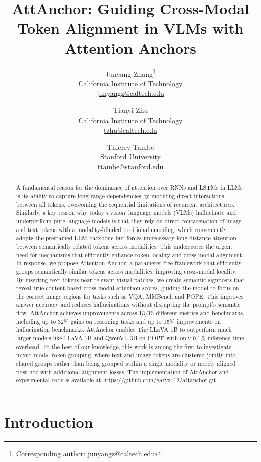 \documentclass[11pt]{article}
\title{AttAnchor: Guiding Cross-Modal Token Alignment in VLMs with Attention Anchors}
\author{Junyang Zhang\footnote{Corresponding author: \href{mailto:junyangz@caltech.edu}{junyangz@caltech.edu}}\\
California Institute of Technology\\
\href{mailto:junyangz@caltech.edu}{junyangz@caltech.edu}
\and
Tianyi Zhu\\
California Institute of Technology\\
\href{mailto:tzhu@caltech.edu}{tzhu@caltech.edu}
\and
Thierry Tambe\\
Stanford University\\
\href{mailto:ttambe@stanford.edu}{ttambe@stanford.edu}
}
\begin{document}
\captionsetup{position=bottom}
\captionsetup[figure]{position=bottom}
\captionsetup[table]{position=bottom}

\maketitle

\begin{abstract}
A fundamental reason for the dominance of attention over RNNs and LSTMs in LLMs is its ability to capture long-range dependencies by modeling direct interactions between all tokens, overcoming the sequential limitations of recurrent architectures. Similarly, a key reason why today's vision–language models (VLMs) hallucinate and underperform pure language models is that they rely on direct concatenation of image and text tokens with a modality-blinded positional encoding, which conveniently adopts the pretrained LLM backbone but forces unnecessary long-distance attention between semantically related tokens across modalities. This underscores the urgent need for mechanisms that efficiently enhance token locality and cross-modal alignment. In response, we propose Attention Anchor, a parameter-free framework that efficiently groups semantically similar tokens across modalities, improving cross-modal locality. By inserting text tokens near relevant visual patches, we create semantic signposts that reveal true content-based cross-modal attention scores, guiding the model to focus on the correct image regions for tasks such as VQA, MMBench and POPE. This improves answer accuracy and reduces hallucinations without disrupting the prompt's semantic flow. AttAnchor achieves improvements across 13/15 different metrics and benchmarks, including up to 32\% gains on reasoning tasks and up to 15\% improvements on hallucination benchmarks. AttAnchor enables TinyLLaVA 1B to outperform much larger models like LLaVA 7B and QwenVL 3B on POPE with only 0.1\% inference time overhead. To the best of our knowledge, this work is among the first to investigate mixed-modal token grouping, where text and image tokens are clustered jointly into shared groups rather than being grouped within a single modality or merely aligned post-hoc with additional alignment losses. The implementation of AttAnchor and experimental code is available at \url{https://github.com/garyz712/attanchor.git}. 
\end{abstract}

\section{Introduction}
\end{document}
